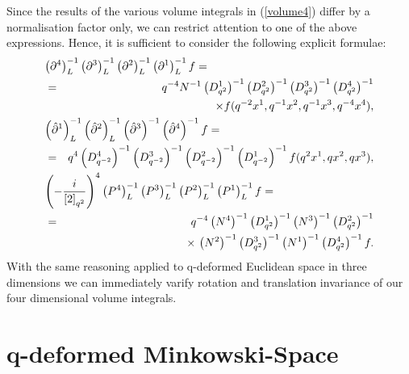 \documentclass[a4paper,11pt,oneside]{article}
\begin{document}
Since the results of the various volume integrals in (\ref{volume4}) differ
by a normalisation factor only, we can restrict attention to one of the
above expressions. Hence, it is sufficient to consider the following explicit
formulae: 
\begin{eqnarray}
\lefteqn{\left( \partial ^{4}\right) _{L}^{-1}\left( \partial ^{3}\right)
_{L}^{-1}\left( \partial ^{2}\right) _{L}^{-1}\left( \partial ^{1}\right)
_{L}^{-1}f =} \\
&=&\hspace*{0cm}q^{-4}N^{-1}\left( D_{q^{2}}^{1}\right) ^{-1}\left(
D_{q^{2}}^{2}\right) ^{-1}\left( D_{q^{2}}^{3}\right) ^{-1}\left(
D_{q^{2}}^{4}\right) ^{-1}  \nonumber \\
&&\hspace*{0cm}\times f(q^{-2}x^{1},q^{-1}x^{2},q^{-1}x^{3},q^{-4}x^{4}), 
\nonumber \\
\lefteqn{\left( \hat{\partial}^{1}\right) _{L}^{-1}\left( \hat{\partial}^{2}\right)
_{L}^{-1}\left( \hat{\partial}^{3}\right) ^{-1}\left( \hat{\partial}%
^{4}\right) ^{-1}f =}  \nonumber \\
&=&\hspace*{0cm}q^{4}\left( D_{q^{-2}}^{4}\right) ^{-1}\left(
D_{q^{-2}}^{3}\right) ^{-1}\left( D_{q^{-2}}^{2}\right) ^{-1}\left(
D_{q^{-2}}^{1}\right) ^{-1}f(q^{2}x^{1},qx^{2},qx^{3}),  \nonumber \\
\lefteqn{\left( -\frac{i}{\left[ 2\right] _{q^{2}}}\right) ^{4}\left( P^{4}\right)
_{L}^{-1}\left( P^{3}\right) _{L}^{-1}\left( P^{2}\right) _{L}^{-1}\left(
P^{1}\right) _{L}^{-1}f =}  \nonumber \\
&=&\hspace*{0cm}q^{-4}\left( N^{4}\right) ^{-1}\left( D_{q^{2}}^{1}\right)
^{-1}\left( N^{3}\right) ^{-1}\left( D_{q^{2}}^{2}\right) ^{-1}  \nonumber \\
&&\hspace*{0cm}\times\, \left( N^{2}\right) ^{-1}\left( D_{q^{2}}^{3}\right)
^{-1}\left( N^{1}\right) ^{-1}\left( D_{q^{2}}^{4}\right) ^{-1}f.  \nonumber
\end{eqnarray}
With the same reasoning applied to q-deformed Euclidean space in three
dimensions we can immediately varify rotation and translation invariance of
our four dimensional volume integrals.

\section{q-deformed Minkowski-Space\label{KapMin}}
\end{document}
